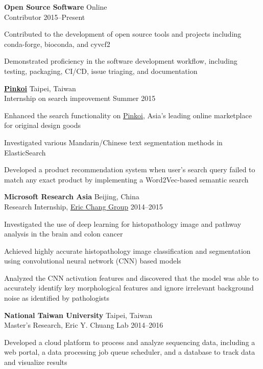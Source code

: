 \begin{entrylist}
\item \textbf{Open Source Software} \hfill Online\\
Contributor \hfill 2015--Present
\begin{detaillist}
    \item Contributed to the development of open source tools and projects including conda-forge, bioconda, and cyvcf2
    \item Demonstrated proficiency in the software development workflow, including testing, packaging, CI/CD, issue triaging, and documentation
\end{detaillist}

\item \href{http://pinkoi.com}{\textbf{Pinkoi}} \hfill Taipei, Taiwan\\
Internship on search improvement \hfill
Summer 2015
\begin{detaillist}
    \item Enhanced the search functionality on \href{http://pinkoi.com}{Pinkoi}, Asia's leading online marketplace for original design goods
    \item Investigated various Mandarin/Chinese text segmentation methods in ElasticSearch
    \item Developed a product recommendation system when user's search query failed to match any exact product by implementing a Word2Vec-based semantic search
\end{detaillist}

\item \textbf{Microsoft Research Asia} \hfill Beijing, China\\
Research Internship, \href{https://www.microsoft.com/en-us/research/people/echang/}{Eric Chang Group} \hfill
2014--2015
\begin{detaillist}
    \item Investigated the use of deep learning for histopathology image and pathway analysis in the brain and colon cancer
    \item Achieved highly accurate histopathology image classification and segmentation using convolutional neural network (CNN) based models
    \item Analyzed the CNN activation features and discovered that the model was able to
    accurately identify key morphological features and ignore irrelevant background noise as identified by pathologists
\end{detaillist}

\item \textbf{National Taiwan University} \hfill Taipei, Taiwan\\
Master's Research, Eric Y. Chuang Lab \hfill
2014--2016
\begin{detaillist}
    \item Developed a cloud platform to process and analyze sequencing data, including a web portal, a data processing job queue scheduler, and a database to track data and visualize results
\end{detaillist}


\end{entrylist}
